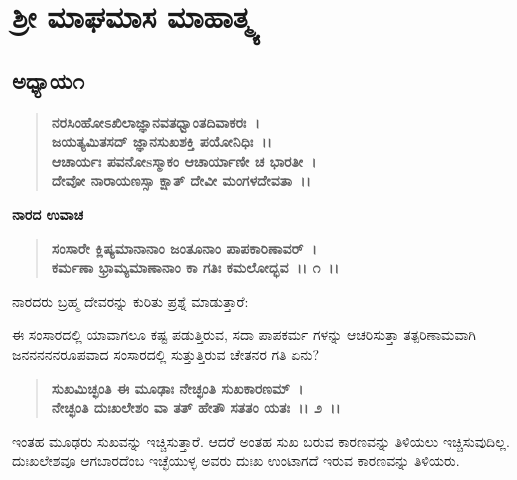 

\begin{center}
\phantom{श्रीः}
\end{center}

\begin{center}
\phantom{।। श्री गुरुराजो विजयते~।।}
\end{center}


\chapter{ ಶ‍್ರೀ ಮಾಘಮಾಸ ಮಾಹಾತ್ಮ್ಯ}

\section*{ಅಧ್ಯಾಯ\enginline{-}೧}

\begin{verse}
\textbf{ನರಸಿಂಹೋಽಖಿಲಾಜ್ಞಾನವತಧ್ವಾಂತದಿವಾಕರಃ~। }\\\textbf{ಜಯತ್ಯಮಿತಸದ್ ಜ್ಞಾನಸುಖಶಕ್ತಿ ಪಯೋನಿಧಿಃ~।।}\\\textbf{ಆಚಾರ್ಯಃ ಪವನೋsಸ್ಮಾಕಂ ಆಚಾರ್ಯಾಣೀ ಚ ಭಾರತೀ~। }\\\textbf{ದೇವೋ ನಾರಾಯಣಸ್ಸಾ ಕ್ಷಾತ್ ದೇವೀ ಮಂಗಳದೇವತಾ~।।}
\end{verse}

\begin{flushleft}
\textbf{ನಾರದ ಉವಾಚ\enginline{-}}
\end{flushleft}

\begin{verse}
\textbf{ಸಂಸಾರೇ ಕ್ಲಿಷ್ಯಮಾನಾನಾಂ ಜಂತೂನಾಂ ಪಾಪಕಾರಿಣಾವರ್~। }\\\textbf{ಕರ್ಮಣಾ ಭ್ರಾಮ್ಯಮಾಣಾನಾಂ ಕಾ ಗತಿಃ ಕಮಲೋದ್ಭವ~।। ೧~।।}
\end{verse}

\noindent
ನಾರದರು ಬ್ರಹ್ಮ ದೇವರನ್ನು ಕುರಿತು ಪ್ರಶ್ನೆ ಮಾಡುತ್ತಾರೆ:\enginline{-}

ಈ ಸಂಸಾರದಲ್ಲಿ ಯಾವಾಗಲೂ ಕಷ್ಟ ಪಡುತ್ತಿರುವ, ಸದಾ ಪಾಪಕರ್ಮ ಗಳನ್ನು ಆಚರಿಸುತ್ತಾ ತತ್ಪರಿಣಾಮವಾಗಿ ಜನನನನನರೂಪವಾದ ಸಂಸಾರದಲ್ಲಿ ಸುತ್ತುತ್ತಿರುವ ಚೇತನರ ಗತಿ ಏನು?

\begin{verse}
\textbf{ಸುಖಮಿಚ್ಛಂತಿ ಈ ಮೂಢಾಃ ನೇಚ್ಛಂತಿ ಸುಖಕಾರಣಮ್~।}\\\textbf{ನೇಚ್ಛಂತಿ ದುಃಖಲೇಶಂ ವಾ ತತ್ ಹೇತೌ ಸತತಂ ಯತಃ~।। ೨~।।}
\end{verse}

ಇಂತಹ ಮೂಢರು ಸುಖವನ್ನು ಇಚ್ಚಿಸುತ್ತಾರೆ. ಆದರೆ ಅಂತಹ ಸುಖ ಬರುವ ಕಾರಣ\-ವನ್ನು ತಿಳಿಯಲು ಇಚ್ಚಿಸುವುದಿಲ್ಲ. ದುಃಖಲೇಶವೂ ಆಗಬಾರದೆಂಬ ಇಚ್ಛೆಯುಳ್ಳ ಅವರು ದುಃಖ ಉಂಟಾಗದೆ ಇರುವ ಕಾರಣವನ್ನು ತಿಳಿಯರು.

